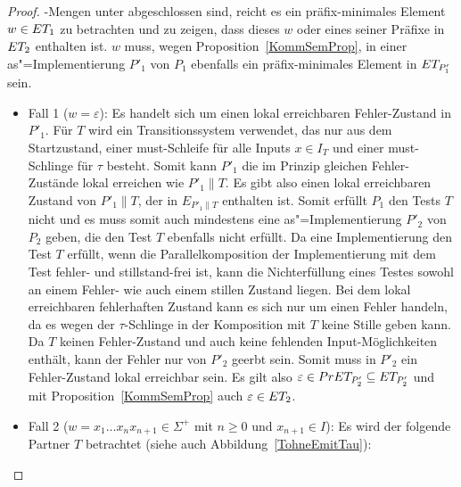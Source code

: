 \begin{proof}
  \ET{}-Mengen unter \cont{} abgeschlossen sind, reicht es ein präfix-minimales
  Element $w\in ET _1$ zu betrachten und zu zeigen, dass dieses $w$ oder eines
  seiner Präfixe in $ET _2$ enthalten ist. $w$ muss, wegen
  Proposition~\ref{KommSemProp}, in einer as"=Implementierung $P'_1$ von $P_1$
  ebenfalls ein präfix-minimales Element in $ET _{P'_1}$ sein.
  \begin{itemize}
    \item Fall 1 ($w=\varepsilon$): Es handelt sich um einen lokal erreichbaren
      Fehler-Zustand in $P'_1$. Für $T$ wird ein Transitionssystem verwendet,
      das nur aus dem Startzustand, einer must-Schleife für alle Inputs $x\in
      I_T$ und einer must-Schlinge für $\tau$ besteht. Somit kann $P'_1$ die im
      Prinzip gleichen Fehler-Zustände lokal erreichen wie $P'_1\|T$. Es gibt
      also einen lokal erreichbaren Zustand von $P'_1\|T$, der in $E_{P'_1\|T}$
      enthalten ist. Somit erfüllt $P_1$ den Tests $T$ nicht und es muss somit
      auch mindestens eine as"=Implementierung $P'_2$ von $P_2$ geben, die den
      Test $T$ ebenfalls nicht erfüllt. Da eine Implementierung den Test $T$
      erfüllt, wenn die Parallelkomposition der Implementierung mit dem Test
      fehler- und stillstand-frei ist, kann die Nichterfüllung eines Testes
      sowohl an einem Fehler- wie auch einem stillen Zustand liegen. Bei dem
      lokal erreichbaren fehlerhaften Zustand kann es sich nur um einen Fehler
      handeln, da es wegen der $\tau$-Schlinge in der Komposition mit $T$ keine
      Stille geben kann. Da $T$ keinen Fehler-Zustand und auch keine fehlenden
      Input-Möglichkeiten enthält, kann der Fehler nur von $P'_2$ geerbt sein.
      Somit muss in $P'_2$ ein Fehler-Zustand lokal erreichbar sein. Es gilt
      also $\varepsilon \in PrET _{P'_2} \subseteq ET _{P'_2}$ und mit
      Proposition~\ref{KommSemProp} auch $\varepsilon\in ET _2$.
    \item Fall 2 ($w=x_1\dots x_n x_{n+1}\in\Sigma ^+$ mit $n\geq 0$ und
      $x_{n+1}\in I$): Es wird der folgende Partner $T$ betrachtet (siehe auch
      Abbildung~\ref{TohneEmitTau}):
\end{itemize}
\end{proof}
